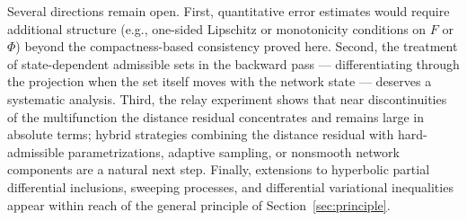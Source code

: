 \documentclass[11pt]{elsarticle}
\theoremstyle{definition}
\theoremstyle{remark}
\numberwithin{equation}{section}
\begin{document}
Several directions remain open. First, quantitative error estimates
would require additional structure (e.g., one-sided Lipschitz or
monotonicity conditions on $F$ or $\Phi$) beyond the compactness-based
consistency proved here. Second, the treatment of state-dependent
admissible sets in the backward pass --- differentiating through the
projection when the set itself moves with the network state --- deserves
a systematic analysis. Third, the relay experiment shows that near
discontinuities of the multifunction the distance residual concentrates
and remains large in absolute terms; hybrid strategies combining the
distance residual with hard-admissible parametrizations, adaptive
sampling, or nonsmooth network components are a natural next step.
Finally, extensions to hyperbolic partial differential inclusions,
sweeping processes, and differential variational inequalities appear
within reach of the general principle of Section~\ref{sec:principle}.




\end{document}
